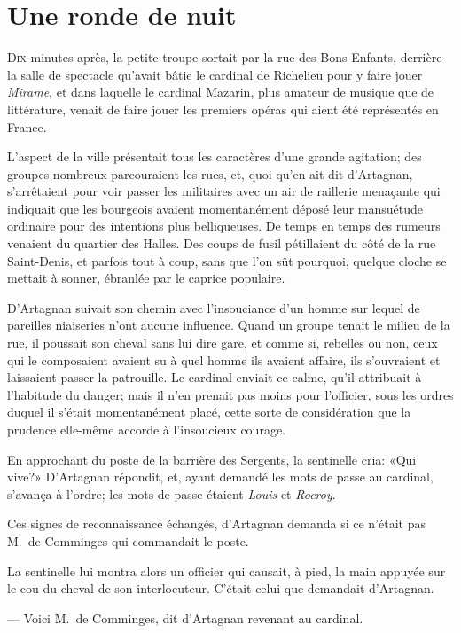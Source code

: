 \chapter{Une ronde de nuit}

\lettrine{D}{ix} minutes après, la petite troupe sortait par la rue des Bons-Enfants, derrière la salle de spectacle qu'avait bâtie le cardinal de Richelieu pour y faire jouer \textit{Mirame}, et dans laquelle le cardinal Mazarin, plus amateur de musique que de littérature, venait de faire jouer les premiers opéras qui aient été représentés en France.

L'aspect de la ville présentait tous les caractères d'une grande agitation; des groupes nombreux parcouraient les rues, et, quoi qu'en ait dit d'Artagnan, s'arrêtaient pour voir passer les militaires avec un air de raillerie menaçante qui indiquait que les bourgeois avaient momentanément déposé leur mansuétude ordinaire pour des intentions plus belliqueuses. De temps en temps des rumeurs venaient du quartier des Halles. Des coups de fusil pétillaient du côté de la rue Saint-Denis, et parfois tout à coup, sans que l'on sût pourquoi, quelque cloche se mettait à sonner, ébranlée par le caprice populaire.

D'Artagnan suivait son chemin avec l'insouciance d'un homme sur lequel de pareilles niaiseries n'ont aucune influence. Quand un groupe tenait le milieu de la rue, il poussait son cheval sans lui dire gare, et comme si, rebelles ou non, ceux qui le composaient avaient su à quel homme ils avaient affaire, ils s'ouvraient et laissaient passer la patrouille. Le cardinal enviait ce calme, qu'il attribuait à l'habitude du danger; mais il n'en prenait pas moins pour l'officier, sous les ordres duquel il s'était momentanément placé, cette sorte de considération que la prudence elle-même accorde à l'insoucieux courage.

En approchant du poste de la barrière des Sergents, la sentinelle cria: «Qui vive?» D'Artagnan répondit, et, ayant demandé les mots de passe au cardinal, s'avança à l'ordre; les mots de passe étaient \textit{Louis} et \textit{Rocroy}.

Ces signes de reconnaissance échangés, d'Artagnan demanda si ce n'était pas M.~de Comminges qui commandait le poste.

La sentinelle lui montra alors un officier qui causait, à pied, la main appuyée sur le cou du cheval de son interlocuteur. C'était celui que demandait d'Artagnan.

— Voici M.~de Comminges, dit d'Artagnan revenant au cardinal.

